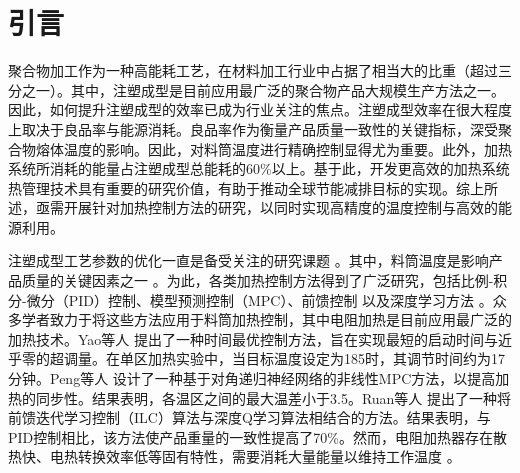 \section{引言}

聚合物加工作为一种高能耗工艺，在材料加工行业中占据了相当大的比重（超过三分之一）\cite{Zhao_2020_intelligent}。其中，注塑成型是目前应用最广泛的聚合物产品大规模生产方法之一\cite{Yao_2007_optimal,Yao_2008_barrel,Peng_2011_melt}。因此，如何提升注塑成型的效率已成为行业关注的焦点\cite{Peng_2011_melta,Peng_2012_model}。注塑成型效率在很大程度上取决于良品率与能源消耗\cite{Chen_2018_online,Chen_2019_monitoring}。良品率作为衡量产品质量一致性的关键指标，深受聚合物熔体温度的影响\cite{Gao_2017_development}。因此，对料筒温度进行精确控制显得尤为重要\cite{Bui_2015_development}。此外，加热系统所消耗的能量占注塑成型总能耗的60\%以上\cite{Brown_2016_energy,Aboud_2019_comprehensive,Chang_2006_experimental}。基于此，开发更高效的加热系统热管理技术具有重要的研究价值，有助于推动全球节能减排目标的实现\cite{Chang_2006_simulation}。综上所述，亟需开展针对加热控制方法的研究，以同时实现高精度的温度控制与高效的能源利用。\par

注塑成型工艺参数的优化一直是备受关注的研究课题 \cite{Jeon_2022_melt,Kanagalakshmi_2016_implementation,Karagoz_2021_effect,Llado_2008_influence}。其中，料筒温度是影响产品质量的关键因素之一 \cite{Manyatsi_2022_effects}。为此，各类加热控制方法得到了广泛研究，包括比例-积分-微分（PID）控制\cite{Martin_2022_infrared,Pongpanyaporn_2020_temperature}、模型预测控制（MPC）\cite{Sanchez_2021_rapid,Tabi_2021_improving,Tian_2021_highly}、前馈控制 \cite{Wen_2020_multizone,Xiang_2020_microstructure} 以及深度学习方法 \cite{Zhao_2021_insitu,Zhao_2022_nozzle,Bui_2015_design}。众多学者致力于将这些方法应用于料筒加热控制，其中电阻加热是目前应用最广泛的加热技术。Yao等人 \cite{Yao_2007_optimal} 提出了一种时间最优控制方法，旨在实现最短的启动时间与近乎零的超调量。在单区加热实验中，当目标温度设定为185\centigrade 时，其调节时间约为17分钟。Peng等人 \cite{Peng_2011_melt} 设计了一种基于对角递归神经网络的非线性MPC方法，以提高加热的同步性。结果表明，各温区之间的最大温差小于3.5\centigrade。Ruan等人 \cite{Ruan_2019_improvinga} 提出了一种将前馈迭代学习控制（ILC）算法与深度Q学习算法相结合的方法。结果表明，与PID控制相比，该方法使产品重量的一致性提高了70\%。然而，电阻加热器存在散热快、电热转换效率低等固有特性，需要消耗大量能量以维持工作温度 \cite{Hopmann_2021_prediction}。\par

